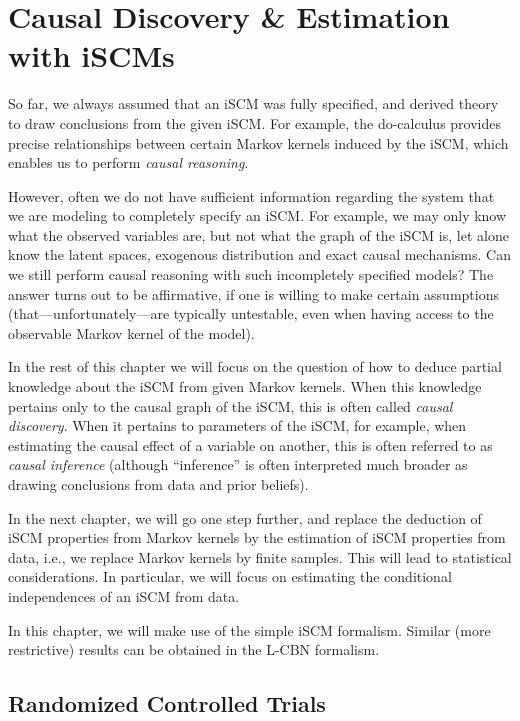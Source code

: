 \section{Causal Discovery \& Estimation with iSCMs}

So far, we always assumed that an iSCM was fully specified, and derived theory to 
draw conclusions from the given iSCM. For example, the do-calculus provides precise
relationships between certain Markov kernels induced by the iSCM,
which enables us to perform \emph{causal reasoning}.

However, often we do not have sufficient information regarding the system that
we are modeling to completely specify an iSCM. For example, we may only know what
the observed variables are, but not what the graph of the iSCM is, let alone know the
latent spaces, exogenous distribution and exact causal mechanisms. Can we still
perform causal reasoning with such incompletely specified models? The answer turns
out to be affirmative, if one is willing to make certain assumptions (that---unfortunately---are 
typically untestable, even when having access to the observable Markov kernel of the model).

In the rest of this chapter we will focus on the question of how to deduce partial knowledge about
the iSCM from given Markov kernels. When this knowledge pertains only to the causal graph of the iSCM,
this is often called \emph{causal discovery}. When it pertains to parameters of the iSCM, for example,
when estimating the causal effect of a variable on another, this is often referred to as \emph{causal 
inference} (although ``inference'' is often interpreted much broader as drawing conclusions from data 
and prior beliefs).

In the next chapter, we will go one step further, and replace the deduction
of iSCM properties from Markov kernels by the estimation of iSCM properties
from data, i.e., we replace Markov kernels by finite samples. This will lead to 
statistical considerations. In particular, we will focus on estimating the
conditional independences of an iSCM from data.

In this chapter, we will make use of the simple iSCM formalism. 
Similar (more restrictive) results can be obtained in the L-CBN formalism.

\subsection{Randomized Controlled Trials}

